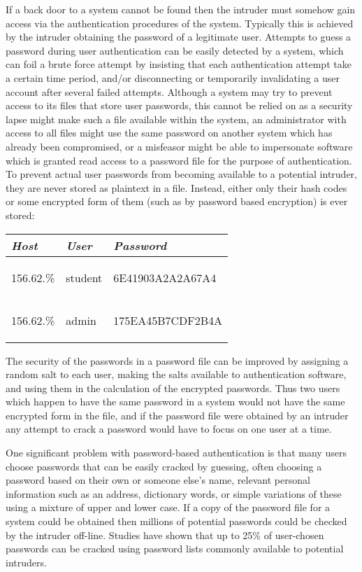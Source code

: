 If a back door to a system cannot be found then the intruder must somehow gain access
via the authentication procedures of the system. Typically this is achieved by
the intruder obtaining the password of a legitimate user.
Attempts to guess a password during user authentication can be easily detected
by a system, which can foil a brute force attempt by insisting that each authentication
attempt take a certain time period, and/or disconnecting or temporarily invalidating
a user account after several failed attempts.
Although a system may try to prevent access to its files that store user passwords,
this cannot be relied on as a security lapse might make such a file available within
the system, an administrator with access to all files might use the same password
on another system which has already been compromised,
or a misfeasor might be able to impersonate software which is granted
read access to a password file for the purpose of authentication.
To prevent actual user passwords from becoming available to a potential intruder,
they are never stored as plaintext in a file. Instead, either only their hash codes
or some encrypted form of them (such as by password based encryption) is ever stored:

\begin{center}
\begin{tabular}{|l|l|l|} \hline
  \textit{Host} & \textit{User} & \textit{Password} \\ \hline\hline
  156.62.\%     & student       & \begin{code}6E41903A2A2A67A4\end{code} \\
  156.62.\%     & admin         & \begin{code}175EA45B7CDF2B4A\end{code} \\ \hline
\end{tabular}
\end{center}

\noindent
The security of the passwords in a password file can be improved by assigning a
random salt to each user, making the salts available to authentication software,
and using them in the calculation of the encrypted passwords.
Thus two users which happen to have the same password in a system would not
have the same encrypted form in the file, and if the password file were obtained
by an intruder any attempt to crack a password would have to focus on one user at a time.

One significant problem with password-based authentication is that many users
choose passwords that can be easily cracked by guessing, often choosing a password based
on their own or someone else's name, relevant personal information such as an address,
dictionary words, or simple variations of these using a mixture of upper and lower case.
If a copy of the password file for a system could be obtained then millions of
potential passwords could be checked by the intruder off-line. Studies
have shown that up to 25\% of user-chosen passwords can be cracked using
password lists commonly available to potential intruders.

